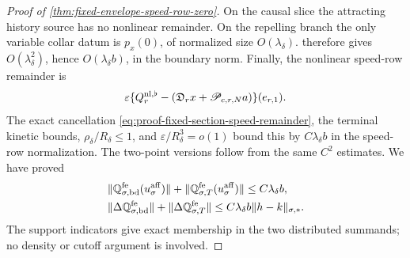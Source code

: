 \begin{proof}[Proof of
\cref{thm:fixed-envelope-speed-row-zero}]
On the causal slice the attracting history source has no nonlinear
remainder.  On the repelling branch the only variable collar datum is
\(p_x(0)\), of normalized size \(O(\lambda_\delta)\).
 therefore gives
\(O(\lambda_\delta^2)\), hence \(O(\lambda_\delta b)\), in the boundary
norm.  Finally, the nonlinear speed-row remainder is
\begin{equation}
 \varepsilon\{Q_r^{\rm nl,\flat}
       -(\mathfrak D_rx+\mathscr P_{c,r,N}a)\}(e_{r,1}).
                                                        \label{eq:proof-fixed-envelope-speed-remainder-row}
\end{equation}
The exact cancellation
\cref{eq:proof-fixed-section-speed-remainder}, the terminal kinetic
bounds, \(\rho_\delta/R_\delta\le1\), and
\(\varepsilon/R_\delta^3=o(1)\) bound this by
\(C\lambda_\delta b\) in the speed-row normalization.  The two-point
versions follow from the same \(C^2\) estimates.  We have proved
\begin{align}
 &\|\mathbb Q_{\sigma,\rm bd}^{\rm fe}
       (u_\sigma^{\rm aff})\|
 +\|\mathbb Q_{\sigma,T}^{\rm fe}
       (u_\sigma^{\rm aff})\|
 \le C\lambda_\delta b,\notag\\
 &\|\Delta\mathbb Q_{\sigma,\rm bd}^{\rm fe}\|
 +\|\Delta\mathbb Q_{\sigma,T}^{\rm fe}\|
 \le C\lambda_\delta b\|h-k\|_{\sigma,*}.        \label{eq:proof-fixed-envelope-boundary-terminal-remainder}
\end{align}
The support indicators give exact membership in the two distributed
summands; no density or cutoff argument is involved.


\end{proof}
